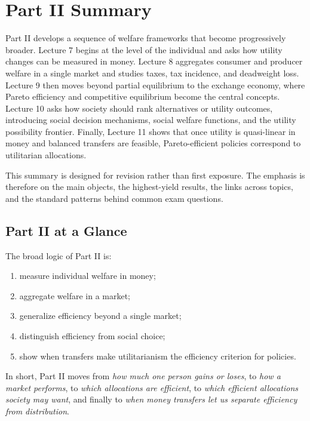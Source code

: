 
\section{Part II Summary}

Part II develops a sequence of welfare frameworks that become progressively broader. Lecture 7 begins at the level of the individual and asks how utility changes can be measured in money. Lecture 8 aggregates consumer and producer welfare in a single market and studies taxes, tax incidence, and deadweight loss. Lecture 9 then moves beyond partial equilibrium to the exchange economy, where Pareto efficiency and competitive equilibrium become the central concepts. Lecture 10 asks how society should rank alternatives or utility outcomes, introducing social decision mechanisms, social welfare functions, and the utility possibility frontier. Finally, Lecture 11 shows that once utility is quasi-linear in money and balanced transfers are feasible, Pareto-efficient policies correspond to utilitarian allocations.

This summary is designed for revision rather than first exposure. The emphasis is therefore on the main objects, the highest-yield results, the links across topics, and the standard patterns behind common exam questions.

\subsection{Part II at a Glance}

\begin{policynote}[title={Part II in one conceptual chain}]
The broad logic of Part II is:
\begin{enumerate}
    \item measure individual welfare in money;
    \item aggregate welfare in a market;
    \item generalize efficiency beyond a single market;
    \item distinguish efficiency from social choice;
    \item show when transfers make utilitarianism the efficiency criterion for policies.
\end{enumerate}
In short, Part II moves from \emph{how much one person gains or loses}, to \emph{how a market performs}, to \emph{which allocations are efficient}, to \emph{which efficient allocations society may want}, and finally to \emph{when money transfers let us separate efficiency from distribution}.
\end{policynote}

